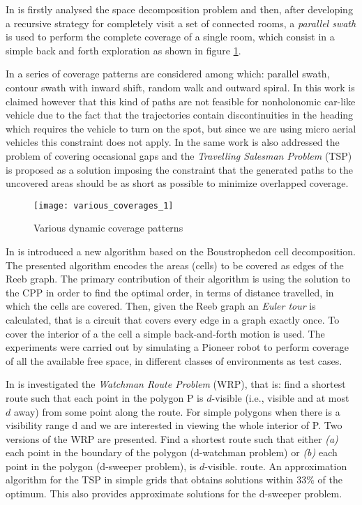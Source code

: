 In \cite{ChongCoverage} is firstly analysed the space decomposition problem and then, after developing a recursive strategy for completely visit a set of connected rooms, a \emph{parallel swath} is used to perform the complete coverage of a single room, which consist in a simple back and forth exploration as shown in figure \ref{fig:covTypes}.

In \cite{navidCovAlgs} a series of coverage patterns are considered among which: parallel swath, contour swath with inward shift, random walk and outward spiral. In this work is claimed however that this kind of paths are not feasible for nonholonomic car-like vehicle due to the fact that the trajectories contain
discontinuities in the heading which requires the vehicle to turn on the spot, but since we are using micro aerial vehicles this constraint does not apply. In the same work is also addressed the problem of covering occasional gaps and the \emph{Travelling Salesman Problem} (TSP) is proposed as a solution imposing the constraint that the generated paths to the uncovered areas should be as short as possible to minimize overlapped coverage.

\begin{figure}[ht]
\centering
\texttt{[image: various\_coverages\_1]}
\caption{Various dynamic coverage patterns}
\label{fig:covTypes}
\end{figure}

In \cite{MannadiarR10} is introduced a new algorithm based on the Boustrophedon cell decomposition. The presented algorithm encodes the areas (cells) to be covered as edges of the Reeb graph. The primary contribution of their algorithm is using the solution to the CPP in order to find the optimal order, in terms of distance travelled, in which the cells are covered. Then, given the Reeb graph an \emph{Euler tour} is calculated, that is a circuit that covers every edge in a graph exactly once. To cover the interior of a the cell a simple back-and-forth motion is used. The experiments were carried out by simulating a Pioneer robot to perform coverage of all the available free space, in different classes of environments as test cases.

In \cite{Naftos:1992} is investigated the \emph{Watchman Route Problem} (WRP), that is: find a shortest route such that each point in the polygon P is $d$-visible (i.e., visible and at most $d$ away) from some point along the route. For simple polygons when there is a visibility range d and we are interested in viewing the whole interior of P. Two versions of the WRP are presented. Find a shortest route such that either \emph{(a)} each point in the boundary of the polygon (d-watchman problem) or \emph{(b)} each point in the polygon (d-sweeper problem), is $d$-visible.
route. An approximation algorithm for the TSP in simple grids that obtains solutions within 33\% of the optimum. This also provides approximate solutions for the d-sweeper problem.

